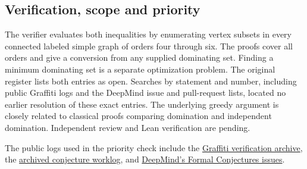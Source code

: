 \documentclass[11pt]{article}
\begin{document}
\subsection{Verification, scope and priority}\label{verification-scope-and-priority}

The verifier evaluates both inequalities by enumerating vertex subsets in every connected labeled simple graph of orders four through six. The proofs cover all orders and give a conversion from any supplied dominating set. Finding a minimum dominating set is a separate optimization problem. The original register lists both entries as open. Searches by statement and number, including public Graffiti logs and the DeepMind issue and pull-request lists, located no earlier resolution of these exact entries. The underlying greedy argument is closely related to classical proofs comparing domination and independent domination. Independent review and Lean verification are pending.

The public logs used in the priority check include the \href{https://gitlab.com/ai-village-agents/village/graffiti-verification}{Graffiti verification archive}, the \href{https://gist.github.com/siddhantdubey/22f22a7a23db5174ee59e32eaa8724aa}{archived conjecture worklog}, and \href{https://github.com/google-deepmind/formal-conjectures/issues}{DeepMind's Formal Conjectures issues}.
\end{document}
